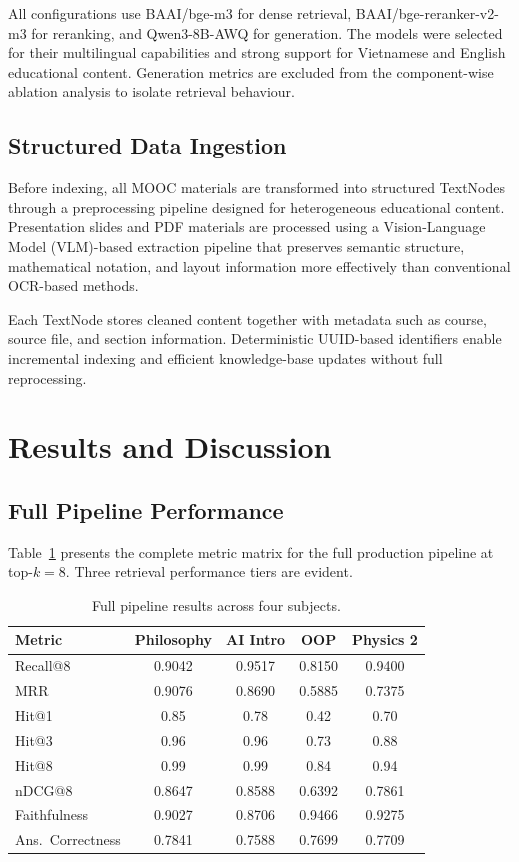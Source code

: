 \documentclass[runningheads]{llncs}
\begin{document}
All configurations use BAAI/bge-m3 for dense retrieval, BAAI/bge-reranker-v2-m3 for reranking, and Qwen3-8B-AWQ for generation. The models were selected for their multilingual capabilities and strong support for Vietnamese and English educational content. Generation metrics are excluded from the component-wise ablation analysis to isolate retrieval behaviour.

\subsection{Structured Data Ingestion}

Before indexing, all MOOC materials are transformed into structured TextNodes through a preprocessing pipeline designed for heterogeneous educational content. Presentation slides and PDF materials are processed using a Vision-Language Model (VLM)-based extraction pipeline that preserves semantic structure, mathematical notation, and layout information more effectively than conventional OCR-based methods.

Each TextNode stores cleaned content together with metadata such as course, source file, and section information. Deterministic UUID-based identifiers enable incremental indexing and efficient knowledge-base updates without full reprocessing.
\FloatBarrier
\section{Results and Discussion}
\label{resdis}

\subsection{Full Pipeline Performance}

Table~\ref{tab:full_pipeline} presents the complete metric matrix for the full production pipeline at top-$k = 8$. Three retrieval performance tiers are evident.

\begin{table}[ht]
\caption{Full pipeline results across four subjects.}
\label{tab:full_pipeline}
\centering
\begin{tabular}{|l|c|c|c|c|}
\hline
Metric & Philosophy & AI Intro & OOP & Physics 2 \\
\hline
Recall@8        & 0.9042 & 0.9517 & 0.8150 & 0.9400 \\
MRR             & 0.9076 & 0.8690 & 0.5885 & 0.7375 \\
Hit@1           & 0.85   & 0.78   & 0.42   & 0.70   \\
Hit@3           & 0.96   & 0.96   & 0.73   & 0.88   \\
Hit@8           & 0.99   & 0.99   & 0.84   & 0.94   \\
nDCG@8          & 0.8647 & 0.8588 & 0.6392 & 0.7861 \\
Faithfulness    & 0.9027 & 0.8706 & 0.9466 & 0.9275 \\
Ans.~Correctness & 0.7841 & 0.7588 & 0.7699 & 0.7709 \\
\hline
\end{tabular}
\end{table}
\end{document}
